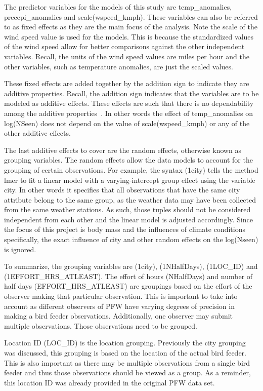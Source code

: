 The predictor variables for the models of this study are temp\_anomalies, precepi\_anomalies and scale(wspeed\_kmph). These variables can also be referred to as fixed effects as they are the main focus of the analysis. Note the scale of the wind speed value is used for the models. This is because the standardized values of the wind speed allow for better comparisons against the other independent variables. Recall, the units of the wind speed values are miles per hour and the other variables, such as temperature anomalies, are just the scaled values.  

These fixed effects are added together by the addition sign to indicate they are additive properties. Recall, the addition sign indicates that the variables are to be modeled as additive effects. These effects are such that there is no dependability among the additive properties~\cite{AddProps:online}. In other words the effect of temp\_anomalies on log(NSeen) does not depend on the value of scale(wspeed\_kmph) or any of the other additive effects.

The last additive effects to cover are the random effects, otherwise known as grouping variables. The random effects allow the data models to account for the grouping of certain observations. For example, the syntax (1\textbar city) tells the method lmer to fit a linear model with a varying-intercept group effect using the variable city. In other words it specifies that all observations that have the same city attribute belong to the same group, as the weather data may have been collected from the same weather stations. As such, those tuples should not be considered independent from each other and the linear model is adjusted accordingly. Since the focus of this project is body mass and the influences of climate conditions specifically, the exact influence of city and other random effects on the log(Nseen) is ignored.    

To summarize, the grouping variables are   
(1\textbar city), (1\textbar NHalfDays), (1\textbar LOC\_ID) and (1\textbar EFFORT\_HRS\_ATLEAST). The effort of hours (NHalfDays) and number of half days (EFFORT\_HRS\_ATLEAST) are groupings based on the effort of the observer making that particular observation. This is important to take into account as different observers of PFW have varying degrees of precision in making a bird feeder observations. Additionally, one observer may submit multiple observations. Those observations need to be grouped. 

Location ID (LOC\_ID) is the location grouping. Previously the city grouping was discussed, this grouping is based on the location of the actual bird feeder. This is also important as there may be multiple observations from a single bird feeder and thus those observations should be viewed as a group. As a reminder, this location ID was already provided in the original PFW data set.

